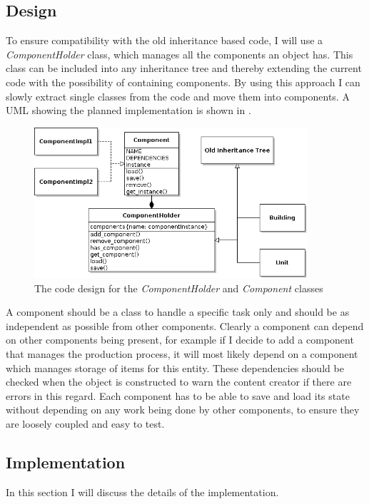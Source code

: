 \subsection{Design}
To ensure compatibility with the old inheritance based code, I will use a \textit{ComponentHolder} class, which manages all the
components an object has. This class can be included into any inheritance tree and thereby extending the current code
with the possibility of containing components. By using this approach I can slowly extract single classes from the code
and move them into components. A UML showing the planned implementation is shown in .

\begin{figure}[H]
\centering
\includegraphics[width=0.9\textwidth]{pics/components_design}
\caption{The code design for the \textit{ComponentHolder} and \textit{Component} classes}
\label{fig:codedesign}
\end{figure}

A component should be a class to handle a specific task only and should be as independent
as possible from other components. Clearly a component can depend on other components being present, for example if I
decide to add a component that manages the production process, it will most likely depend on a component which manages
storage of items for this entity. These dependencies should be checked when the object is constructed to warn the
content creator if there are errors in this regard.
Each component has to be able to save and load its state without depending on any work being done by other components,
to ensure they are loosely coupled and easy to test.

\subsection{Implementation}
In this section I will discuss the details of the implementation.


